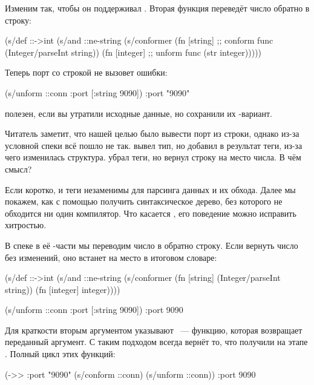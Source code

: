 Изменим  так, чтобы он поддерживал . Вторая функция
переведёт число обратно в строку:


\begin{clojure}
(s/def ::->int
  (s/and
   ::ne-string
   (s/conformer
    (fn [string] ;; conform func
      (Integer/parseInt string))
    (fn [integer] ;; unform func
      (str integer)))))
\end{clojure}


\noindent
Теперь порт со строкой не вызовет ошибки:


\begin{clojure}
(s/unform ::conn {:port [:string 9090]})
{:port "9090"}
\end{clojure}


 полезен, если вы утратили исходные данные, но сохранили их
-вариант.

Читатель заметит, что нашей целью было вывести порт из строки, однако из-за
условной спеки  всё пошло не так.  вывел тип, но
добавил в результат теги, из-за чего изменилась структура.  убрал
теги, но вернул строку на место числа. В чём смысл?

Если коротко,  и теги незаменимы для парсинга данных и их
обхода. Далее мы покажем, как с помощью  получить синтаксическое
дерево, без которого не обходится ни один компилятор. Что касается
, его поведение можно исправить хитростью.

В спеке  в её -части мы переводим число в обратно
строку. Если вернуть число без изменений, оно встанет на место  в
итоговом словаре:


\begin{clojure}
(s/def ::->int
  (s/and
   ::ne-string
   (s/conformer
    (fn [string]
      (Integer/parseInt string))
    (fn [integer]
      integer))))

(s/unform ::conn {:port [:string 9090]})
{:port 9090}
\end{clojure}



Для краткости вторым аргументом указывают ~--- функцию, которая
возвращает переданный аргумент. С таким подходом  всегда вернёт то,
что получили на этапе . Полный цикл этих функций:


\begin{clojure}
(->> {:port "9090"}
     (s/conform ::conn)
     (s/unform ::conn))
{:port 9090}
\end{clojure}


